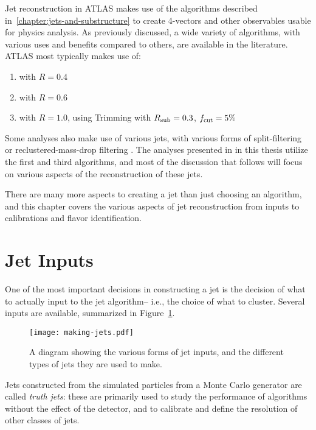 \label{chapter:jet-reconstruction}


Jet reconstruction in ATLAS makes use of the algorithms described in~\ref{chapter:jets-and-substructure} to create 4-vectors and other observables usable for physics analysis. As previously discussed, a wide variety of algorithms, with various uses and benefits compared to others, are available in the literature. ATLAS most typically makes use of:

\begin{enumerate}
	\item \antikt with $R = 0.4$
	\item \antikt with $R = 0.6$
	\item \antikt with $R = 1.0$, using Trimming with $R_{\rm sub} = 0.3$, $f_{\rm cut} = 5\%$
\end{enumerate}
%
Some analyses also make use of various \CAFat jets, with various forms of split-filtering or reclustered-mass-drop filtering . The analyses presented in in this thesis utilize the first and third algorithms, and most of the discussion that follows will focus on various aspects of the reconstruction of these jets.

There are many more aspects to creating a jet than just choosing an algorithm, and this chapter covers the various aspects of jet reconstruction from inputs to calibrations and flavor identification. 

\section{Jet Inputs}


One of the most important decisions in constructing a jet is the decision of what to actually input to the jet algorithm-- i.e., the choice of what to cluster. Several inputs are available, summarized in Figure~\ref{fig:jet-reconstruction:making-jets}. 


\begin{figure}
\centering
\texttt{[image: making-jets.pdf]}
\label{fig:jet-reconstruction:making-jets}
\caption{A diagram showing the various forms of jet inputs, and the different types of jets they are used to make.}
\end{figure}


Jets constructed from the simulated particles from a Monte Carlo generator are called \textit{truth jets}: these are primarily used to study the performance of algorithms without the effect of the detector, and to calibrate and define the resolution of other classes of jets. 


